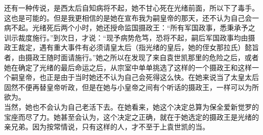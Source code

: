 还有一种传说，是西太后自知病将不起，她不甘心死在光绪前面，所以下了毒手。这也是可能的。但是我更相信的是她在宣布我为嗣皇帝的那天，还不认为自己会一病不起。光绪死后两个小时，她还授命监国摄政王：“所有军国政事，悉秉承予之训示裁度施行。”到次日，才说：“现予病势危笃，恐将不起，嗣后军国政事均由摄政王裁定，遇有重大事件有必须请皇太后（指光绪的皇后，她的侄女那拉氏）懿旨者，由摄政王随时面请施行。”她之所以在发现了来自袁世凯那里的危险之后，或者她在确定了光绪的最后命运之后，从宗室中单单挑选了这样的一个摄政王和这样一个嗣皇帝，也正是由于当时她还不认为自己会死得这么快。在她来说当了太皇太后固然不便再替皇帝听政，但是在她与小皇帝之间有个听话的摄政王，一样可以为所欲为。\\

当然，她也不会认为自己老活下去。在她看来，她这个决定总算为保全爱新觉罗的宝座而尽了力。她甚至会认为，这个决定之正确，就在于她选定的摄政王是光绪的亲兄弟。因为按常情说，只有这样的人，才不至于上袁世凯的当。\\